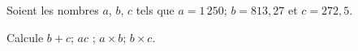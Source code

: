 Soient les nombres $a$, $b$, $c$ tels que $a=1\,250$; $b=813,27$ et $c=272,5$.
\par Calcule $b+c$; $a­c$ ; $a\times b$; $b\times c$.
\kern2cm\kern2cm\kern2cm